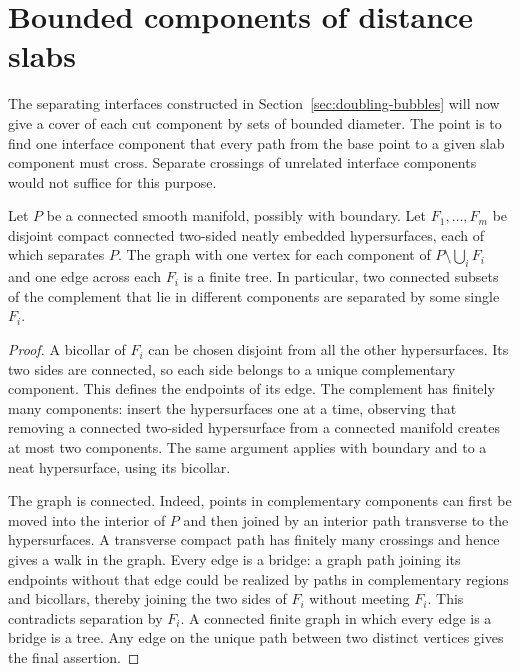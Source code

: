 \section{Bounded components of distance slabs}
\label{sec:slabs}

The separating interfaces constructed in Section~\ref{sec:doubling-bubbles}
will now give a cover of each cut component by sets of bounded diameter.
The point is to find one interface component that every path from the
base point to a given slab component must cross.  Separate crossings of
unrelated interface components would not suffice for this purpose.

\begin{lemma}
\label{lem:region-tree}
Let $P$ be a connected smooth manifold, possibly with boundary.  Let
$F_1,\ldots,F_m$ be disjoint compact connected two-sided neatly embedded
hypersurfaces, each of which separates $P$.  The graph with one vertex for
each component of $P\setminus\bigcup_i F_i$ and one edge across each $F_i$
is a finite tree.  In particular, two connected subsets of the complement
that lie in different components are separated by some single $F_i$.
\end{lemma}

\begin{proof}
A bicollar of $F_i$ can be chosen disjoint from all the other
hypersurfaces.  Its two sides are connected, so each side belongs to a
unique complementary component.  This defines the endpoints of its
edge.  The complement has finitely many components: insert the
hypersurfaces one at a time, observing that removing a connected
two-sided hypersurface from a connected manifold creates at most two
components.  The same argument applies with boundary and to a neat
hypersurface, using its bicollar.

The graph is connected.  Indeed, points in complementary components
can first be moved into the interior of $P$ and then joined by an
interior path transverse to the hypersurfaces.  A transverse compact
path has finitely many crossings and hence gives a walk in the graph.
Every edge is a bridge: a graph path joining its endpoints without
that edge could be realized by paths in complementary regions and
bicollars, thereby joining the two sides of $F_i$ without meeting
$F_i$.  This contradicts separation by $F_i$.  A connected finite
graph in which every edge is a bridge is a tree.  Any edge on the
unique path between two distinct vertices gives the final assertion.
\end{proof}

